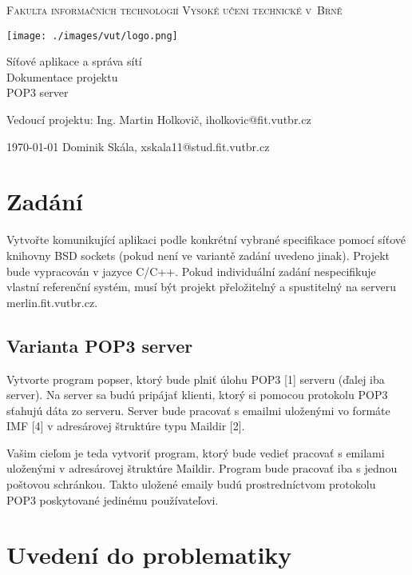 \documentclass[11pt,a4paper]{report}
\makeatletter
\def\myauthor{Dominik Skála, xskala11@stud.fit.vutbr.cz}
\def\myleader{Vedoucí projektu:}
\def\myleadername{Ing. Martin Holkovič, iholkovic@fit.vutbr.cz}
\def\mytitle{Síťové aplikace a správa sítí \\ Dokumentace projektu}
\makeatother
\begin{document}
\thispagestyle{empty}
\begin{center}
\Huge
\textsc{Fakulta informačních technologií Vysoké učení technické v~Brně}

    \begin{center}
        \texttt{[image: ./images/vut/logo.png]}
    \end{center}
\mytitle
\\
\LARGE POP3 server
\end{center}

{\Large
\begin{flushleft}
\myleader \hfill
\myleadername
\end{flushleft}
 \begin{flushright}
 \today \hfill
\myauthor
\end{flushright}}

\clearpage

\tableofcontents %

\clearpage
\section{Zadání}
Vytvořte komunikující aplikaci podle konkrétní vybrané specifikace pomocí síťové knihovny BSD sockets (pokud není ve variantě zadání uvedeno jinak). Projekt bude vypracován v jazyce C/C++. Pokud individuální zadání nespecifikuje vlastní referenční systém, musí být projekt přeložitelný a spustitelný na serveru merlin.fit.vutbr.cz.
\subsection{Varianta POP3 server}
Vytvorte program popser, ktorý bude plniť úlohu POP3 [1] serveru (ďalej iba server). Na server sa budú pripájať klienti, ktorý si pomocou protokolu POP3 sťahujú dáta zo serveru. Server bude pracovať s emailmi uloženými vo formáte IMF [4] v adresárovej štruktúre typu Maildir [2].

Vašim cieľom je teda vytvoriť program, ktorý bude vedieť pracovať s emilami uloženými v adresárovej štruktúre Maildir. Program bude pracovať iba s jednou poštovou schránkou. Takto uložené emaily budú prostredníctvom protokolu POP3 poskytované jedinému používateľovi.
\section{Uvedení do problematiky}
\end{document}
